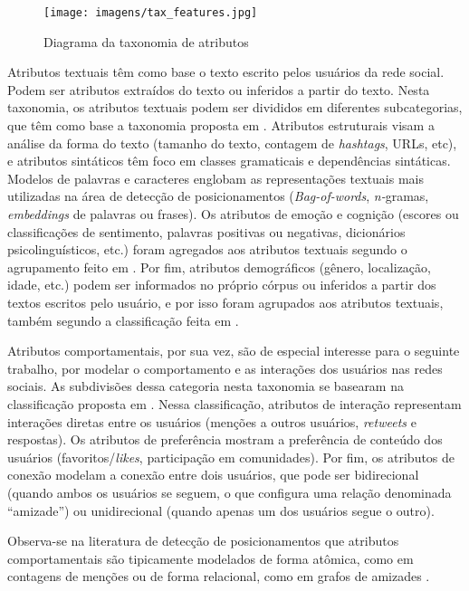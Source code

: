\documentclass[
	12pt, oneside, a4paper, english, brazil
]{abntex2ppgsi}
\begin{document}
\begin{figure}[H]
	\centering
 	  \caption{Diagrama da taxonomia de atributos}
	\texttt{[image: imagens/tax\_features.jpg]}
	\label{fig:tax_features}
\end{figure}

Atributos textuais têm como base o texto escrito pelos usuários da rede social. Podem ser atributos extraídos do texto ou inferidos a partir do texto. Nesta taxonomia, os atributos textuais podem ser divididos em diferentes subcategorias, que têm como base a taxonomia proposta em . Atributos estruturais visam a análise da forma do texto (tamanho do texto, contagem de {\em hashtags}, URLs, etc), e atributos sintáticos têm foco em classes gramaticais e dependências sintáticas. Modelos de palavras e caracteres englobam as representações textuais mais utilizadas na área de detecção de posicionamentos ({\em Bag-of-words}, {\em n-}gramas, {\em embeddings} de palavras ou frases). Os atributos de emoção e cognição (escores ou classificações de sentimento, palavras positivas ou negativas, dicionários psicolinguísticos, etc.) foram agregados aos atributos textuais segundo o agrupamento feito em . Por fim, atributos demográficos (gênero, localização, idade, etc.) podem ser informados no próprio córpus ou inferidos a partir dos textos escritos pelo usuário, e por isso foram agrupados aos atributos textuais, também segundo a classificação feita em .

Atributos comportamentais, por sua vez, são de especial interesse para o seguinte trabalho, por modelar o comportamento e as interações dos usuários nas redes sociais. As subdivisões dessa categoria nesta taxonomia se basearam na classificação proposta em . Nessa classificação, atributos de interação representam interações diretas entre os usuários (menções a outros usuários, {\em retweets} e respostas). Os atributos de preferência mostram a preferência de conteúdo dos usuários (favoritos/{\em likes}, participação em comunidades). Por fim, os atributos de conexão modelam a conexão entre dois usuários, que pode ser bidirecional (quando ambos os usuários se seguem, o que configura uma relação denominada ``amizade'') ou unidirecional (quando apenas um dos usuários segue o outro).

Observa-se na literatura de detecção de posicionamentos que atributos comportamentais são tipicamente modelados de forma atômica, como em contagens de menções \cite{paolo2017, olga2017} ou de forma relacional, como em grafos de amizades \cite{espinosa2020deepreading}.
\end{document}
